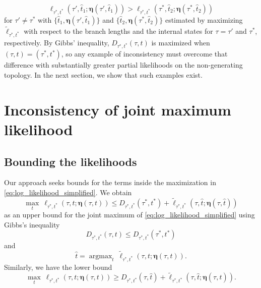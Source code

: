 \documentclass{article}
\newcommand{\fullAncestralSplitPartitions}{\boldsymbol\eta}
\newcommand{\shannonDivergence}{D}
\DeclareMathOperator*{\argmax}{argmax}
\begin{document}
\begin{equation}
\label{eq:inconsistency_inequality}
\ell_{\tau^*,t^*}(\tau', \hat{t}_1; \fullAncestralSplitPartitions(\tau', \hat{t}_1)) > \ell_{\tau^*,t^*}(\tau^*, \hat{t}_2; \fullAncestralSplitPartitions(\tau^*, \hat{t}_2))
\end{equation}
for $\tau'\neq\tau^*$ with $\{\hat{t}_1,\fullAncestralSplitPartitions(\tau', \hat{t}_1)\}$ and $\{\hat{t}_2,\fullAncestralSplitPartitions(\tau^*, \hat{t}_2)\}$ estimated by maximizing $\tilde{\ell}_{\tau^*,t^*}$ with respect to the branch lengths and the internal states for $\tau = \tau'$ and $\tau^*$, respectively.
By Gibbs' inequality, $\shannonDivergence_{\tau^*,t^*}(\tau,t)$ is maximized when $(\tau,t) = (\tau^*,t^*)$, so any example of inconsistency must overcome that difference with substantially greater partial likelihoods on the non-generating topology.
In the next section, we show that such examples exist.

\section{Inconsistency of joint maximum likelihood}

\subsection{Bounding the likelihoods}

Our approach seeks bounds for the terms inside the maximization in \eqref{eq:log_likelihood_simplified}.
We obtain
$$
\max_{t} \ \ell_{\tau^*,t^*}(\tau, t; \fullAncestralSplitPartitions(\tau,t)) \le
    \shannonDivergence_{\tau^*,t^*}(\tau^*,t^*)
    + \tilde{\ell}_{\tau^*,t^*}(\tau, \hat{t}; \fullAncestralSplitPartitions(\tau, \hat{t}))
$$
as an upper bound for the joint maximum of \eqref{eq:log_likelihood_simplified} using Gibbs's inequality
$$
\shannonDivergence_{\tau^*,t^*}(\tau,t) \le \shannonDivergence_{\tau^*,t^*}(\tau^*,t^*)
$$
and
$$
\hat{t} = \argmax_{t} \ \tilde{\ell}_{\tau^*,t^*}(\tau, t; \fullAncestralSplitPartitions(\tau,t)).
$$
Similarly, we have the lower bound
$$
\max_{t} \ \ell_{\tau^*,t^*}(\tau, t; \fullAncestralSplitPartitions(\tau,t)) \ge
    \shannonDivergence_{\tau^*,t^*}(\tau,\hat{t})
    + \tilde{\ell}_{\tau^*,t^*}(\tau, \hat{t}; \fullAncestralSplitPartitions(\tau, \hat{t})).
$$
\end{document}
